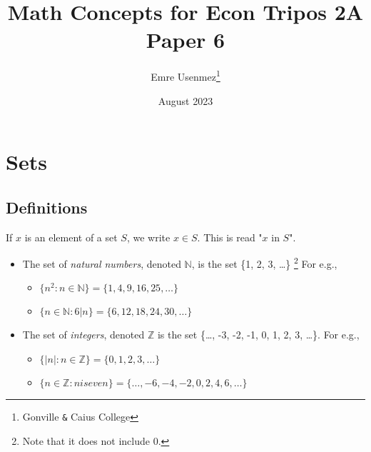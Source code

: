 \documentclass{report}
\title{Math Concepts for Econ Tripos 2A Paper 6}
\author{Emre Usenmez\thanks{Gonville \verb|&| Caius College}}
\date{August 2023}
\begin{document}


\chapter{Sets}

\section{Definitions}

If $x$ is an element of a set $S$, we write $x \in S$. This is read "$x$ in $S$".

\begin{itemize}
  \item The set of \emph{natural numbers}, denoted $\mathbb{N}$, is the set \{1, 2, 3, \dots\} \footnote{Note that it does not include 0.} For e.g.,
  \begin{itemize}
    \item $\{n^2:n \in \mathbb{N} \} = \{1, 4, 9, 16, 25, \dots\}$
    \item $\{n \in \mathbb{N} : 6|n\} = \{6, 12, 18, 24, 30, \dots\}$
  \end{itemize}

  \item The set of \emph{integers}, denoted $\mathbb{Z}$ is the set \{\dots, -3, -2, -1, 0, 1, 2, 3, \dots \}. For e.g.,
  \begin{itemize}
    \item $\{|n|:n \in \mathbb{Z} \} = \{0, 1, 2, 3, \dots\}$
    \item $\{n \in \mathbb{Z}: n is even\} = \{\dots, -6, -4, -2, 0, 2, 4, 6, \dots \}$
  \end{itemize}


\end{itemize}
\end{document}
